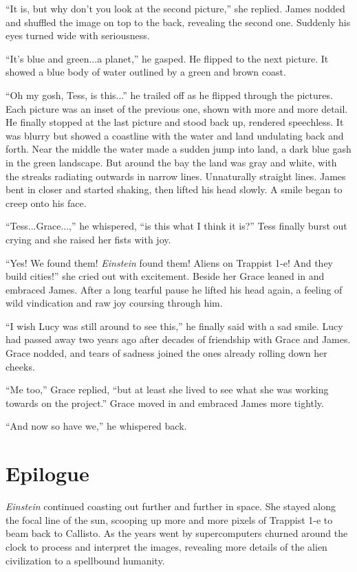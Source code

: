 \documentclass[12pt]{article} %
\begin{document}
``It is, but why don't you look at the second picture,'' she replied. James nodded and shuffled the image on top to the back, revealing the second one. Suddenly his eyes turned wide with seriousness.

``It's blue and green...a planet,'' he gasped. He flipped to the next picture. It showed a blue body of water outlined by a green and brown coast.

``Oh my gosh, Tess, is this...'' he trailed off as he flipped through the pictures. Each picture was an inset of the previous one, shown with more and more detail. He finally stopped at the last picture and stood back up, rendered speechless. It was blurry but showed a coastline with the water and land undulating back and forth. Near the middle the water made a sudden jump into land, a dark blue gash in the green landscape. But around the bay the land was gray and white, with the streaks radiating outwards in narrow lines. Unnaturally straight lines. James bent in closer and started shaking, then lifted his head slowly. A smile began to creep onto his face.

``Tess...Grace...,'' he whispered, ``is this what I think it is?'' Tess finally burst out crying and she raised her fists with joy.

``Yes! We found them! \textit{Einstein} found them! Aliens on Trappist 1-e! And they build cities!'' she cried out with excitement. Beside her Grace leaned in and embraced James. After a long tearful pause he lifted his head again, a feeling of wild vindication and raw joy coursing through him.

``I wish Lucy was still around to see this,'' he finally said with a sad smile. Lucy had passed away two years ago after decades of friendship with Grace and James. Grace nodded, and tears of sadness joined the ones already rolling down her cheeks.

``Me too,'' Grace replied, ``but at least she lived to see what she was working towards on the project.'' Grace moved in and embraced James more tightly.

``And now so have we,'' he whispered back.


\newpage
\section{Epilogue}

\textit{Einstein} continued coasting out further and further in space. She stayed along the focal line of the sun, scooping up more and more pixels of Trappist 1-e to beam back to Callisto. As the years went by supercomputers churned around the clock to process and interpret the images, revealing more details of the alien civilization to a spellbound humanity.
\end{document}
